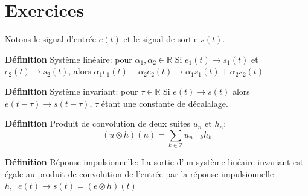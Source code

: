 \documentclass[12pt]{article}
\begin{document}
\section*{Exercices}

Notons le signal d'entrée $e(t)$ et le signal de sortie $s(t)$.


\textbf{Définition} Système linéaire: pour $\alpha_1, \alpha_2 \in \mathbb{R}$\newline
Si $e_1(t) \rightarrow s_1(t)$ et $e_2(t) \rightarrow s_2(t)$, alors $\alpha_1 e_1(t) + \alpha_2 e_2(t) \rightarrow \alpha_1 s_1(t) + \alpha_2 s_2(t)$

\textbf{Définition} Système invariant: pour $\tau \in \mathbb{R}$ \newline
Si $e(t) \rightarrow s(t)$ alors $e(t-\tau) \rightarrow s(t-\tau)$, $\tau$ étant une constante de décalalage.

\textbf{Définition} Produit de convolution de deux suites $u_n$ et $h_n$: \newline
$$ (u \otimes h)(n) = \sum_{k \in \mathbb{Z}} u_{n-k}h_k $$

\textbf{Définition} Réponse impulsionnelle: \newline
La sortie d'un système linéaire invariant est égale au produit de convolution de l'entrée par la réponse impulsionnelle $h, \;\;e(t) \longrightarrow s(t) = (e \otimes h)(t)$
\end{document}
